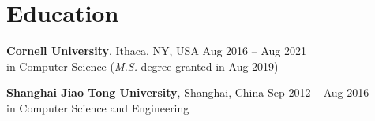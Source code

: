 \section{Education}
% 
% 
\noindent \textbf{Cornell University}, Ithaca, NY, USA \hfill Aug 2016 -- Aug 2021\\
{} in Computer Science ({\sl M.S.} degree granted in Aug 2019)

\noindent \textbf{Shanghai Jiao Tong University}, Shanghai, China \hfill Sep 2012 -- Aug 2016 \\
 in Computer Science and Engineering \\